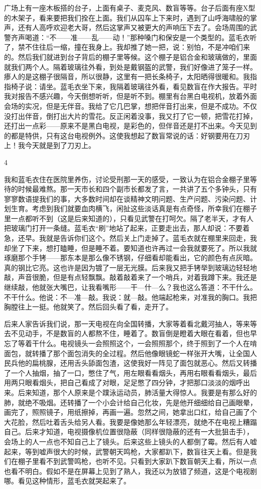 广场上有一座木板搭的台子，上面有桌子、麦克风、数盲等等。台子后面有座X型的木架子，看来要把我们拴在上面。我们从囚车上下来时，遇到了山呼海啸般的掌声，还有人高呼欢迎老大哥，然后这掌声又被更大的声响压下去了。会场周围的武警齐声喝道：“不——准——乱——动！”那种嗓门和保安是一个类型的。蓝毛衣听了，禁不住往后一缩，撞在我身上。我却推了她一把，说：别怕，不是冲咱们来的。然后我们就进到台子背后的棚子里等候。这个棚子是铝合金和玻璃做的，里面就我们两个人。隔着玻璃往外看，到处是戴钢盔的武警，我们好像进了笼子一样。瘆人的是这棚子很隔音，所以很静，这里有一把长条椅子，太阳晒得很暖和。我指指椅子说：请坐。蓝毛衣坐下来，我隔着玻璃往外看，看见数盲在作大报告。平时我对报告不感兴趣，今天倒想听听，但是听不到。棚里有台黑白电视机，放着外面会场的实况，但是无伴音。我给了它几巴掌，想把伴音打出来，但是不成功。不仅没打出伴音，倒打出大片的雪花。反正闲着没事，我又打了它一顿，把雪花打掉，还打出一点彩——原来不是黑白电视，是彩色的，但伴音还是打不出来。今天见到的都是特供，只有这台电视例外。这使我想起了数盲常说的话：好钢要用在刀刃上！我今天就是到了刀刃上。 



4 

我和蓝毛衣住在医院里养伤，讨论受刑那一天的感受，一致认为在铝合金棚子里等待的时候最难熬。那一天市长和四个副市长都发了言，一共讲了五个多钟头，只有寥寥数语提我们的事，大多数时间却在谈精神文明问题、生产问题、污染问题、计划生育。考虑到我们就要血肉横飞，闲扯这些淡话真是有点奇怪，所幸我们在棚子里一点都听不到（这是后来知道的），只看见武警在打呵欠。隔了老半天，才有人把玻璃门打开一条缝。蓝毛衣“刷”地站了起来，正要走出去，那人却说：不要着急，还早。我就是告诉你们这个。然后关上门走掉了。蓝毛衣就在棚里来回走，我却坐了下来，想打瞌睡，但是睡不着。要知道也许再过一会我就要死了。所以我就琢磨那个手铐——那东本是那么像不锈钢，仔细看却能看出，它的颜色有点灰暗。真的钢比它亮。这也许是因为镀了一层无光膜。后来我又把手铐举到玻璃边轻轻地敲，声音很脆，但是有点轻飘飘。敲着敲着来了一个哨兵，对着我蹲下来。我还是继续敲，他就张大嘴巴，让我看嘴形——干—什—么？我也这么答道：不干什么。不干什么。他说：不—准—敲。我说：就—敲。他端起枪来，对准我的胸口。我把胸膛往上一挺。他就笑了。然后回头看了看，走开了。 

后来人家告诉我们说，那一天电视在向全国转播，大家等着看北戴河抽人，等来等去不见动手，不是数盲的人都熬不住，睡着了。数盲倒是瞪着大眼在看着，但也早忘了等着干什么。电视镜头一会照照这个，一会照照那个，终于照到了一个人在啃面包，就转播了那个面包消失的全过程。然后他像眼镜蛇一样张开大嘴，让全国人民兵他的扁桃腺，还用舌头舔面包渣，这使我好一阵见了面包就恶心。然后又转播了一个人抽烟，抽了一口，憋住了气，用左眼看看烟头，再用右眼看看烟头，最后用两只眼看烟头，把自己看成了对眼，足足憋了四分钟，才把那口淡淡的烟呼出来。后来知道，那个人原来是个蹼泳运动员，肺活量大得惊人。我要是有那么好的肺，就绝不吸烟。还转播了一个小会计给自己化妆，先是他开细细给自己画眼晕，画完了，照照镜子，用纸擦掉，再画一遍。忽然之间，她拿出口红，给自己画了个大花脸，然后吐着舌头给另人看。我要是像她那么年轻漂亮，就绝不在电视上糟蹋自己。后来才知道，电视摄像机位置很隐蔽（同样很隐蔽的还有一大批狙击手），会场上的人一点也不知自己上了镜头。后来这些上镜头的人都倒了霉。然后有人嘘起来，等到嘘声很大的时候，武警朝天鸣枪，大家都趴下，数盲往天上看。但是我们在棚子里看不到武警鸣枪，也听不见。只看到大家趴下数盲朝天上看，所以一点也看不明白。假如不是在屏幕上见到了熟人，我还以为放错了频道，这是个电视剧哪。看见这种情形，蓝毛衣就哭起来了。 

